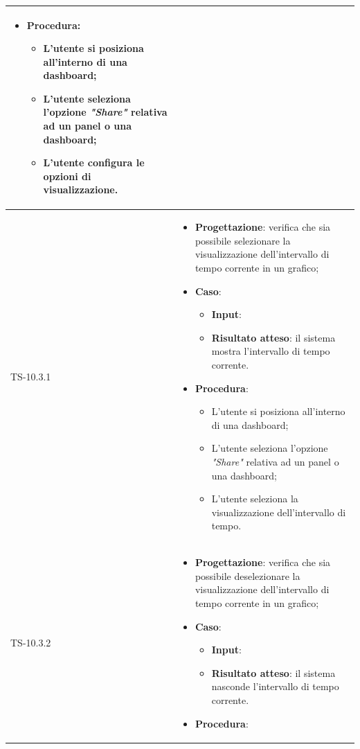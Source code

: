 \begin{longtable}{|C{2.5cm}|C{13cm}|}
\begin{itemize}
\begin{itemize}
	\end{itemize}
	\item \textbf{Procedura}:
	\begin{itemize}
		\item L'utente si posiziona all'interno di una dashboard;
		\item L'utente seleziona l'opzione \emph{"Share"} relativa ad un panel o una dashboard;
		\item L'utente configura le opzioni di visualizzazione.
	\end{itemize} 
\end{itemize}
	\\
	\hline
	{TS-10.3.1} &
\begin{itemize}
	\item \textbf{Progettazione}: verifica che sia  possibile selezionare la
	visualizzazione dell'intervallo di tempo corrente in un grafico;
	\item \textbf{Caso}: 
	\begin{itemize}
		\item \textbf{Input}: 
		\item \textbf{Risultato atteso}: il sistema mostra l'intervallo di tempo corrente.
	\end{itemize}
	\item \textbf{Procedura}:
	\begin{itemize}
		\item L'utente si posiziona all'interno di una dashboard;
		\item L'utente seleziona l'opzione \emph{"Share"} relativa ad un panel o una dashboard;
		\item L'utente seleziona la visualizzazione dell'intervallo di tempo.
	\end{itemize} 
\end{itemize}
	  \\
	\hline
	{TS-10.3.2} &
\begin{itemize}
	\item \textbf{Progettazione}: verifica che sia possibile deselezionare la
	visualizzazione dell'intervallo di tempo corrente in un grafico;
	\item \textbf{Caso}: 
	\begin{itemize}
		\item \textbf{Input}: 
		\item \textbf{Risultato atteso}: il sistema nasconde l'intervallo di tempo corrente.
	\end{itemize}
	\item \textbf{Procedura}:

\end{itemize}
\end{longtable}
